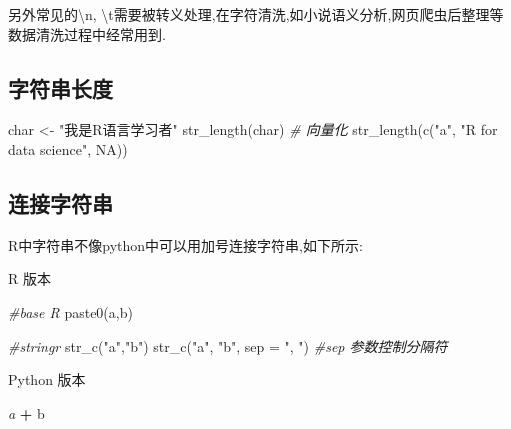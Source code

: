 \documentclass[
]{book}
\newenvironment{Shaded}{\begin{snugshade}}{\end{snugshade}}
\newcommand{\AttributeTok}[1]{\textcolor[rgb]{0.77,0.63,0.00}{#1}}
\newcommand{\CommentTok}[1]{\textcolor[rgb]{0.56,0.35,0.01}{\textit{#1}}}
\newcommand{\ConstantTok}[1]{\textcolor[rgb]{0.00,0.00,0.00}{#1}}
\newcommand{\FunctionTok}[1]{\textcolor[rgb]{0.00,0.00,0.00}{#1}}
\newcommand{\NormalTok}[1]{#1}
\newcommand{\OperatorTok}[1]{\textcolor[rgb]{0.81,0.36,0.00}{\textbf{#1}}}
\newcommand{\OtherTok}[1]{\textcolor[rgb]{0.56,0.35,0.01}{#1}}
\newcommand{\StringTok}[1]{\textcolor[rgb]{0.31,0.60,0.02}{#1}}
\begin{document}
另外常见的\textbackslash n, \textbackslash t需要被转义处理,在字符清洗,如小说语义分析,网页爬虫后整理等数据清洗过程中经常用到.

\hypertarget{ux5b57ux7b26ux4e32ux957fux5ea6}{%
\subsection{字符串长度}\label{ux5b57ux7b26ux4e32ux957fux5ea6}}

\begin{Shaded}
\begin{Highlighting}[]
\NormalTok{char }\OtherTok{\textless{}{-}} \StringTok{"我是R语言学习者"}
\FunctionTok{str\_length}\NormalTok{(char)}
\CommentTok{\# 向量化}
\FunctionTok{str\_length}\NormalTok{(}\FunctionTok{c}\NormalTok{(}\StringTok{"a"}\NormalTok{, }\StringTok{"R for data science"}\NormalTok{, }\ConstantTok{NA}\NormalTok{))}
\end{Highlighting}
\end{Shaded}

\hypertarget{ux8fdeux63a5ux5b57ux7b26ux4e32}{%
\subsection{连接字符串}\label{ux8fdeux63a5ux5b57ux7b26ux4e32}}

R中字符串不像python中可以用加号连接字符串,如下所示:

R 版本

\begin{Shaded}
\begin{Highlighting}[]
\CommentTok{\#base R}
\FunctionTok{paste0}\NormalTok{(}\StringTok{\textquotesingle{}a\textquotesingle{}}\NormalTok{,}\StringTok{\textquotesingle{}b\textquotesingle{}}\NormalTok{)}

\CommentTok{\#stringr}
\FunctionTok{str\_c}\NormalTok{(}\StringTok{"a"}\NormalTok{,}\StringTok{"b"}\NormalTok{)}
\FunctionTok{str\_c}\NormalTok{(}\StringTok{"a"}\NormalTok{, }\StringTok{"b"}\NormalTok{, }\AttributeTok{sep =} \StringTok{", "}\NormalTok{) }\CommentTok{\#sep 参数控制分隔符}
\end{Highlighting}
\end{Shaded}

Python 版本

\begin{Shaded}
\begin{Highlighting}[]
\CommentTok{\textquotesingle{}a\textquotesingle{}} \OperatorTok{+} \StringTok{\textquotesingle{}b\textquotesingle{}}
\end{Highlighting}
\end{Shaded}
\end{document}
